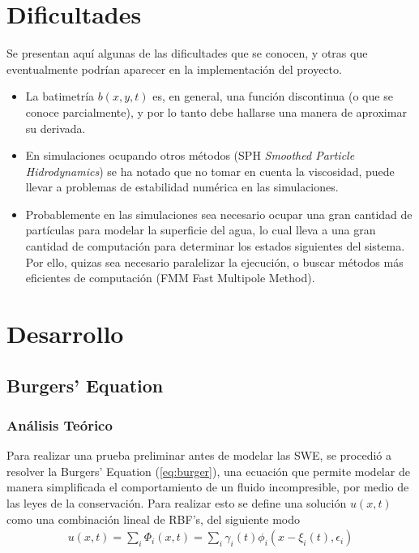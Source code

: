 ﻿\documentclass[spanish, fleqn]{article}
\begin{document}
\section{Dificultades}
Se presentan aquí algunas de las dificultades que se conocen, y otras que eventualmente podrían aparecer en la implementación 
del proyecto.
\begin{itemize}
	\item La batimetría $b(x,y,t)$ es, en general, una función discontinua (o que se conoce parcialmente), y por lo tanto 
	debe hallarse una manera de aproximar su derivada.
	\item En simulaciones ocupando otros métodos (SPH \textit{Smoothed Particle Hidrodynamics}) se ha notado que no tomar 
	en cuenta la viscosidad, puede llevar a problemas de estabilidad numérica en las simulaciones.
	\item Probablemente en las simulaciones sea necesario ocupar una gran cantidad de partículas para modelar la superficie
	del agua, lo cual lleva a una gran cantidad de computación para determinar los estados siguientes del sistema. Por ello,
	quizas sea necesario paralelizar la ejecución, o buscar métodos más eficientes de computación (FMM Fast Multipole 
	Method).
\end{itemize}                                                                                                                                                                                                                                                                                                                                                                                                     
\newpage  
\section{Desarrollo}
  \subsection{Burgers' Equation}
  \subsubsection{Análisis Teórico}
    Para realizar una prueba preliminar antes de modelar las SWE, se procedió a resolver la Burgers' Equation (\ref{eq:burger}), una ecuación que permite modelar de manera simplificada el comportamiento de un fluido incompresible, por medio de las leyes de la conservación. Para realizar esto se define una solución $u(x,t)$ como una combinación lineal de RBF's, del siguiente modo
    \begin{align}
      u(x,t) = \sum_{i} \Phi_i(x,t) = \sum_i \gamma_i(t)\phi_i(x-\xi_i(t),\epsilon_i)
    \end{align}
    
\end{document}

